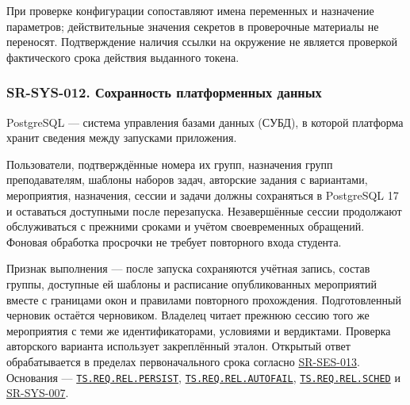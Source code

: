 \documentclass[12pt,a4paper]{article}
\begin{document}
При проверке конфигурации сопоставляют имена переменных и назначение параметров; действительные значения секретов в проверочные материалы не переносят. Подтверждение наличия ссылки на окружение не является проверкой фактического срока действия выданного токена.

\subsubsection{SR-SYS-012. Сохранность платформенных данных}\label{sr-sys-012-ux441ux43eux445ux440ux430ux43dux43dux43eux441ux442ux44c-ux43fux43bux430ux442ux444ux43eux440ux43cux435ux43dux43dux44bux445-ux434ux430ux43dux43dux44bux445}

\hypertarget{sr-sys-012-сохранность-платформенных-данных}{}

\hypertarget{sr-sys-012}{}

PostgreSQL --- система управления базами данных (СУБД), в которой платформа хранит сведения между запусками приложения.

Пользователи, подтверждённые номера их групп, назначения групп преподавателям, шаблоны наборов задач, авторские задания с вариантами, мероприятия, назначения, сессии и задачи должны сохраняться в PostgreSQL 17 и оставаться доступными после перезапуска. Незавершённые сессии продолжают обслуживаться с прежними сроками и учётом своевременных обращений. Фоновая обработка просрочки не требует повторного входа студента.

Признак выполнения --- после запуска сохраняются учётная запись, состав группы, доступные ей шаблоны и расписание опубликованных мероприятий вместе с границами окон и правилами повторного прохождения. Подготовленный черновик остаётся черновиком. Владелец читает прежнюю сессию того же мероприятия с теми же идентификаторами, условиями и вердиктами. Проверка авторского варианта использует закреплённый эталон. Открытый ответ обрабатывается в пределах первоначального срока согласно {\hyperlink{sr-ses-013}{SR-SES-013}}. Основания --- {\href{../02\_Техническое\_задание/DOC-02\_Техническое\_задание.pdf\#ts-req-rel-persist}{\texttt{TS.\allowbreak{}REQ.\allowbreak{}REL.\allowbreak{}PERSIST}}}, {\href{../02\_Техническое\_задание/DOC-02\_Техническое\_задание.pdf\#ts-req-rel-autofail}{\texttt{TS.\allowbreak{}REQ.\allowbreak{}REL.\allowbreak{}AUTOFAIL}}}, {\href{../02\_Техническое\_задание/DOC-02\_Техническое\_задание.pdf\#ts-req-rel-sched}{\texttt{TS.\allowbreak{}REQ.\allowbreak{}REL.\allowbreak{}SCHED}}} и {\hyperlink{sr-sys-007}{SR-SYS-007}}.
\end{document}

